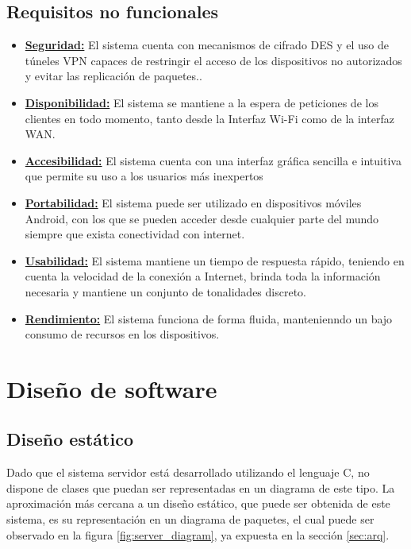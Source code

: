 \documentclass[12pt]{article}
\begin{document}
    \subsection{Requisitos no funcionales}
        \begin{itemize}
            \item \textbf{\underline{Seguridad:}}
            El sistema cuenta con mecanismos de cifrado DES y el uso de túneles VPN capaces de restringir el acceso de los dispositivos no autorizados y evitar las replicación de paquetes..
            \item \textbf{\underline{Disponibilidad:}}
            El sistema se mantiene a la espera de peticiones de los clientes en todo momento, tanto desde la Interfaz Wi-Fi como de la interfaz WAN.
            \item \textbf{\underline{Accesibilidad:}}
            El sistema cuenta con una interfaz gráfica sencilla e intuitiva que permite su uso a los usuarios más inexpertos
            \item \textbf{\underline{Portabilidad:}}
            El sistema puede ser utilizado en dispositivos móviles Android, con los que se pueden acceder desde cualquier parte del mundo siempre que exista conectividad con internet.
            \item \textbf{\underline{Usabilidad:}}
            El sistema mantiene un tiempo de respuesta rápido, teniendo en cuenta la velocidad de la conexión a Internet, brinda toda la información necesaria y mantiene un conjunto de tonalidades discreto.
            \item \textbf{\underline{Rendimiento:}}
            El sistema funciona de forma fluida, mantenienndo un bajo consumo de recursos en los dispositivos.
        \end{itemize}

\section{Diseño de software} \label{sec:dis}
    \subsection{Diseño estático}
        Dado que el sistema servidor está desarrollado utilizando el lenguaje C, no dispone de clases que puedan ser representadas en un diagrama de este tipo. La aproximación más cercana a un diseño estático, que puede ser obtenida de este sistema, es su representación en un diagrama de paquetes, el cual puede ser observado en la figura \ref{fig:server_diagram}, ya expuesta en la sección \ref{sec:arq}.
\end{document}
